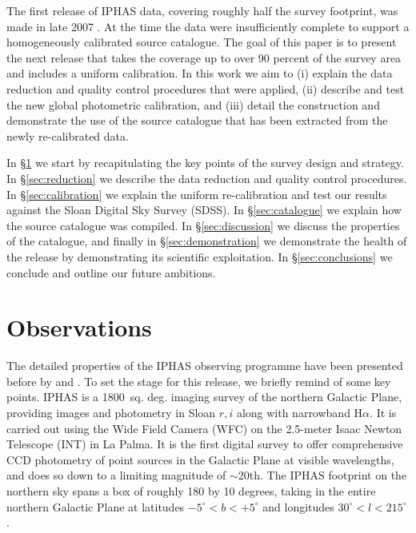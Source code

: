 \documentclass[useAMS,usenatbib]{mn2e}
\begin{document}
The first release of IPHAS data, 
covering roughly half the survey footprint,
was made in late 2007 \citep{Gonzalez-Solares2008}. 
At the time the data were insufficiently complete 
to support a homogeneously calibrated source catalogue.
The goal of this paper is to present the next release 
that takes the coverage up to over 90 percent of the survey area 
and includes a uniform calibration.
In this work we aim to
(i) explain the data reduction 
and quality control procedures that were applied,
(ii) describe and test the new global photometric calibration, and 
(iii) detail the construction and demonstrate the use 
of the source catalogue that has been extracted 
from the newly re-calibrated data.

In \S\ref{sec:observations} we start by recapitulating the key points
of the survey design and strategy.
In \S\ref{sec:reduction} we describe the data reduction
and quality control procedures.
In \S\ref{sec:calibration} we explain the uniform re-calibration
and test our results against the Sloan Digital Sky Survey (SDSS).
In \S\ref{sec:catalogue} we explain how the source catalogue was compiled.
In \S\ref{sec:discussion} we discuss the properties of the catalogue,
and finally in \S\ref{sec:demonstration} we demonstrate
the health of the release by demonstrating its scientific exploitation.
In \S\ref{sec:conclusions} we conclude and outline
our future ambitions.


\section{Observations}
\label{sec:observations}

The detailed properties of the IPHAS observing programme 
have been presented before 
by \citet{Drew2005} and \citet{Gonzalez-Solares2008}. 
To set the stage for this release, we briefly remind of some key points.
IPHAS is a 1800~sq. deg. imaging survey of the northern Galactic Plane, 
providing images and photometry in Sloan $r, i$ 
along with narrowband H$\alpha$. 
It is carried out using the Wide Field Camera (WFC) 
on the 2.5-meter Isaac Newton Telescope (INT) in La Palma. 
It is the first digital survey to offer comprehensive CCD photometry
of point sources in the Galactic Plane at visible wavelengths, 
and does so down to a limiting magnitude of $\sim$20th.
The IPHAS footprint on the northern sky spans a box 
of roughly 180 by 10 degrees, 
taking in the entire northern Galactic Plane 
at latitudes $-5^{\circ} < b < +5^{\circ}$ 
and longitudes $30^{\circ} < l < 215^{\circ}$.
\end{document}
